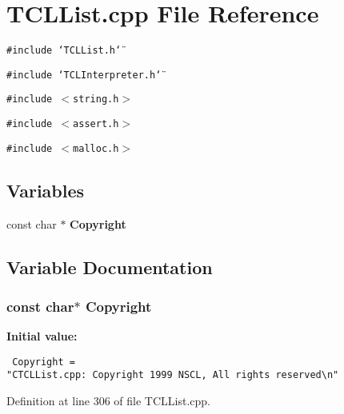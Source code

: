 \section{TCLList.cpp File Reference}
\label{TCLList_8cpp}
{\tt \#include \char`\"{}TCLList.h\char`\"{}}\par
{\tt \#include \char`\"{}TCLInterpreter.h\char`\"{}}\par
{\tt \#include $<$string.h$>$}\par
{\tt \#include $<$assert.h$>$}\par
{\tt \#include $<$malloc.h$>$}\par
\subsection*{Variables}
\begin{CompactItemize}
\item 
const char $\ast$ {\bf Copyright}
\end{CompactItemize}


\subsection{Variable Documentation}
\subsubsection{\setlength{\rightskip}{0pt plus 5cm}const char$\ast$ Copyright\hspace{0.3cm}{\tt  [static]}}\label{TCLList_8cpp_a0}


{\bf Initial value:}

\footnotesize\begin{verbatim} Copyright = 
"CTCLList.cpp: Copyright 1999 NSCL, All rights reserved\n"\end{verbatim}\normalsize 


Definition at line 306 of file TCLList.cpp.